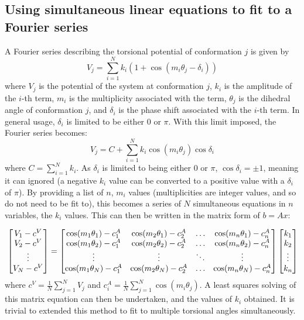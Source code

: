 \documentclass[11pt, oneside, draft]{article}   	%
\begin{document}
\subsection{Using simultaneous linear equations to fit to a Fourier series}
A Fourier series describing the torsional potential of conformation $j$ is given by
\begin{equation}
V_{j} = \sum_{i=1}^{N}k_{i}({1 + \cos(m_{i}\theta_{j} - \delta_{i})})
\end{equation}
where $V_{j}$ is the potential of the system at conformation $j$, $k_{i}$ is the amplitude of the $i$-th term, $m_{i}$ is the multiplicity associated with the term, $\theta_{j}$ is the dihedral angle of conformation $j$, and $\delta_{i}$ is the phase shift associated with the $i$-th term. In general usage, $\delta_{i}$ is limited to be either 0 or $\pi$. With this limit imposed, the Fourier series becomes:
\begin{equation}
V_{j} = C + \sum_{i=1}^{N}k_{i}\cos(m_{i}\theta_{j})\cos\delta_{i}
\end{equation}
where $C = \sum_{i=1}^{N}{k_{i}}$. As $\delta_{i}$ is limited to being either 0 or $\pi$, $\cos\delta_{i} = \pm 1$, meaning it can ignored (a negative $k_{i}$ value can be converted to a positive value with a $\delta_{i}$ of $\pi$). By providing a list of $n$, $m_{i}$ values (multiplicities are integer values, and so do not need to be fit to), this becomes a series of $N$ simultaneous equations in $n$ variables, the $k_{i}$ values. This can then be written in the matrix form of $b = Ax$:

\begin{equation}
\\
\begin{bmatrix}
V_{1} - c^{V}\\
V_{2} - c^{V}\\
\vdots\\
V_{N} - c^{V} 
\end{bmatrix}
 = 
\begin{bmatrix}
\cos(m_{1}\theta_{1})-c_{1}^A & \cos(m_{2}\theta_{1})-c_{2}^A & \ldots & \cos(m_{n}\theta_{1})-c_{n}^A \\
\cos(m_{1}\theta_{2})-c_{1}^A & \cos(m_{2}\theta_{2})-c_{2}^A & \ldots & \cos(m_{n}\theta_{2})-c_{n}^A \\
\vdots & \vdots & \ddots & \vdots \\
\cos(m_{1}\theta_{N})-c_{1}^A & \cos(m_{2}\theta_{N})-c_{2}^A & \ldots & \cos(m_{n}\theta_{N})-c_{n}^A \\
\end{bmatrix}
\begin{bmatrix}
k_{1} \\
k_{2} \\
\vdots \\
k_{n}
\end{bmatrix}
\end{equation}
where $c^V = \frac{1}{N}\sum_{j=1}^{N} V_{j}$ and $c_{i}^{A} = \frac{1}{N}\sum_{j=1}^{N} \cos(m_{i}\theta_{j})$. A least squares solving of this matrix equation can then be undertaken, and the values of $k_{i}$ obtained. It is trivial to extended this method to fit to multiple torsional angles simultaneously.
\end{document}
